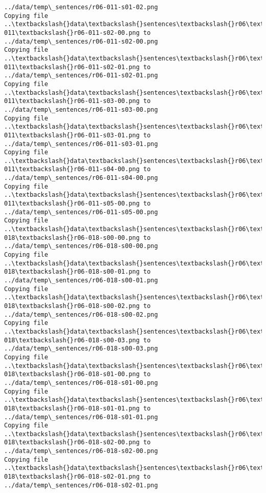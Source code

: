 \documentclass[11pt]{article}
\begin{document}
\begin{Verbatim}[commandchars=\\\{\}]
../data/temp\_sentences/r06-011-s01-02.png
Copying file ..\textbackslash{}data\textbackslash{}sentences\textbackslash{}r06\textbackslash{}r06-011\textbackslash{}r06-011-s02-00.png to
../data/temp\_sentences/r06-011-s02-00.png
Copying file ..\textbackslash{}data\textbackslash{}sentences\textbackslash{}r06\textbackslash{}r06-011\textbackslash{}r06-011-s02-01.png to
../data/temp\_sentences/r06-011-s02-01.png
Copying file ..\textbackslash{}data\textbackslash{}sentences\textbackslash{}r06\textbackslash{}r06-011\textbackslash{}r06-011-s03-00.png to
../data/temp\_sentences/r06-011-s03-00.png
Copying file ..\textbackslash{}data\textbackslash{}sentences\textbackslash{}r06\textbackslash{}r06-011\textbackslash{}r06-011-s03-01.png to
../data/temp\_sentences/r06-011-s03-01.png
Copying file ..\textbackslash{}data\textbackslash{}sentences\textbackslash{}r06\textbackslash{}r06-011\textbackslash{}r06-011-s04-00.png to
../data/temp\_sentences/r06-011-s04-00.png
Copying file ..\textbackslash{}data\textbackslash{}sentences\textbackslash{}r06\textbackslash{}r06-011\textbackslash{}r06-011-s05-00.png to
../data/temp\_sentences/r06-011-s05-00.png
Copying file ..\textbackslash{}data\textbackslash{}sentences\textbackslash{}r06\textbackslash{}r06-018\textbackslash{}r06-018-s00-00.png to
../data/temp\_sentences/r06-018-s00-00.png
Copying file ..\textbackslash{}data\textbackslash{}sentences\textbackslash{}r06\textbackslash{}r06-018\textbackslash{}r06-018-s00-01.png to
../data/temp\_sentences/r06-018-s00-01.png
Copying file ..\textbackslash{}data\textbackslash{}sentences\textbackslash{}r06\textbackslash{}r06-018\textbackslash{}r06-018-s00-02.png to
../data/temp\_sentences/r06-018-s00-02.png
Copying file ..\textbackslash{}data\textbackslash{}sentences\textbackslash{}r06\textbackslash{}r06-018\textbackslash{}r06-018-s00-03.png to
../data/temp\_sentences/r06-018-s00-03.png
Copying file ..\textbackslash{}data\textbackslash{}sentences\textbackslash{}r06\textbackslash{}r06-018\textbackslash{}r06-018-s01-00.png to
../data/temp\_sentences/r06-018-s01-00.png
Copying file ..\textbackslash{}data\textbackslash{}sentences\textbackslash{}r06\textbackslash{}r06-018\textbackslash{}r06-018-s01-01.png to
../data/temp\_sentences/r06-018-s01-01.png
Copying file ..\textbackslash{}data\textbackslash{}sentences\textbackslash{}r06\textbackslash{}r06-018\textbackslash{}r06-018-s02-00.png to
../data/temp\_sentences/r06-018-s02-00.png
Copying file ..\textbackslash{}data\textbackslash{}sentences\textbackslash{}r06\textbackslash{}r06-018\textbackslash{}r06-018-s02-01.png to
../data/temp\_sentences/r06-018-s02-01.png

\end{Verbatim}
\end{document}
